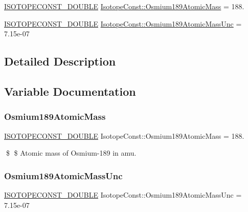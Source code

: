 \begin{DoxyCompactItemize}
\item 
\mbox{\hyperlink{group___isotope_const-_macros_ga8f45a7272ce02c0b4c65c44636ed719a}{I\+S\+O\+T\+O\+P\+E\+C\+O\+N\+S\+T\+\_\+\+D\+O\+U\+B\+LE}} \mbox{\hyperlink{group___isotope_const-_osmium-_os189_gac2d9943834244768d323c442ea80aec6}{Isotope\+Const\+::\+Osmium189\+Atomic\+Mass}} = 188.
\item 
\mbox{\hyperlink{group___isotope_const-_macros_ga8f45a7272ce02c0b4c65c44636ed719a}{I\+S\+O\+T\+O\+P\+E\+C\+O\+N\+S\+T\+\_\+\+D\+O\+U\+B\+LE}} \mbox{\hyperlink{group___isotope_const-_osmium-_os189_ga65bd80ae2ca6d18cfc958ad52bc041b2}{Isotope\+Const\+::\+Osmium189\+Atomic\+Mass\+Unc}} = 7.\+15e-\/07
\end{DoxyCompactItemize}


\subsection{Detailed Description}


\subsection{Variable Documentation}
\mbox{\label{group___isotope_const-_osmium-_os189_gac2d9943834244768d323c442ea80aec6}} 
\subsubsection{\texorpdfstring{Osmium189\+Atomic\+Mass}{Osmium189AtomicMass}}
{\footnotesize\ttfamily \mbox{\hyperlink{group___isotope_const-_macros_ga8f45a7272ce02c0b4c65c44636ed719a}{I\+S\+O\+T\+O\+P\+E\+C\+O\+N\+S\+T\+\_\+\+D\+O\+U\+B\+LE}} Isotope\+Const\+::\+Osmium189\+Atomic\+Mass = 188.}

\$ \$ Atomic mass of Osmium-\/189 in amu. \mbox{\label{group___isotope_const-_osmium-_os189_ga65bd80ae2ca6d18cfc958ad52bc041b2}} 
\subsubsection{\texorpdfstring{Osmium189\+Atomic\+Mass\+Unc}{Osmium189AtomicMassUnc}}
{\footnotesize\ttfamily \mbox{\hyperlink{group___isotope_const-_macros_ga8f45a7272ce02c0b4c65c44636ed719a}{I\+S\+O\+T\+O\+P\+E\+C\+O\+N\+S\+T\+\_\+\+D\+O\+U\+B\+LE}} Isotope\+Const\+::\+Osmium189\+Atomic\+Mass\+Unc = 7.\+15e-\/07}

